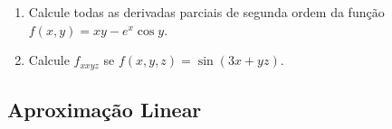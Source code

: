 \begin{frame}[label=der-parciais]
\begin{casa}
\begin{enumerate}
\item Calcule todas as derivadas parciais de segunda ordem da função $f(x,y)=xy-e^x\cos y$.
\item  Calcule $f_{xxyz}$ se $f(x,y,z)=\sin(3x+yz)$.
%
%
\end{enumerate}
\end{casa}
\end{frame}

%
%
%	
%	
%	
%	

\subsection*{Aproximação Linear}

